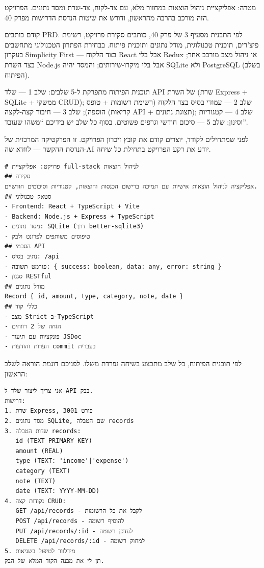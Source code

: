 

מטרה: אפליקציית ניהול הוצאות במחזור מלא, עם צד-לקוח, צד-שרת ומסד נתונים. הפרויקט הזה מורכב בהרבה מהראשון, ודורש את שיטות הנדסת הדרישות מפרק 40.

קודם כותבים PRD. לפי התבנית מסעיף 3 של פרק 40, כותבים סקירת פרויקט, רשימת פיצ'רים, תוכנית טכנולוגית, מודל נתונים ותוכנית פיתוח. בבחירת הפתרון הטכנולוגי מתחשבים בעקרון Simplicity First — בצד הלקוח React אבל בלי Redux או ניהול מצב מורכב אחר; בצד השרת Node.js אבל בלי מיקרו-שירותים; והמסד יהיה SQLite ולא PostgreSQL (בשלב הפיתוח).

תוכנית הפיתוח מתפרקת ל-5 שלבים: שלב 1 — שלד API של השרת (שרת Express + SQLite + ממשקי CRUD); שלב 2 — עמודי בסיס בצד הלקוח (רשימת רשומות + טופס הוספה); שלב 3 — חיבור קצה-לקצה (קריאות API + תצוגת נתונים); שלב 4 — קטגוריות וסינון; שלב 5 — סיכום חודשי וגרפים פשוטים. בסוף כל שלב יש בידיכם “משהו שעובד”.


לפני שמתחילים לקודד, יוצרים קודם את קובץ זיכרון הפרויקט. זו הפרקטיקה המרכזית של הנדסת ההקשר — לוודא שה-AI יודע את רקע הפרויקט בתחילת כל שיחה.

\begin{lstlisting}
# פרויקט: אפליקציית full-stack לניהול הוצאות
## סקירה
אפליקציה לניהול הוצאות אישיות עם תמיכה ברישום הכנסות והוצאות, קטגוריות וסיכומים חודשיים.
## סטאק טכנולוגי
- Frontend: React + TypeScript + Vite
- Backend: Node.js + Express + TypeScript
- מסד נתונים: SQLite (דרך better-sqlite3)
- טיפוסים משותפים לפרונט ולבק
## הסכמי API
- נתיב בסיס: /api
- פורמט תשובה: { success: boolean, data: any, error: string }
- סגנון RESTful
## מודל נתונים
Record { id, amount, type, category, note, date }
## כללי קוד
- מצב Strict ב-TypeScript
- הזחה של 2 רווחים
- פונקציות עם תיעוד JSDoc
- הערות והודעות commit בעברית
\end{lstlisting}


לפי תוכנית הפיתוח, כל שלב מתבצע בשיחה נפרדת משלו. לפניכם דוגמת הוראה לשלב הראשון:

\begin{lstlisting}
אני צריך ליצור שלד ל-API בבק.
דרישות:
1. שרת Express, פורט 3001
2. מסד נתונים SQLite, שם הטבלה records
3. שדות הטבלה records:
   id (TEXT PRIMARY KEY)
   amount (REAL)
   type (TEXT: 'income'|'expense')
   category (TEXT)
   note (TEXT)
   date (TEXT: YYYY-MM-DD)
4. נקודות קצה CRUD:
   GET /api/records - לקבל את כל הרשומות
   POST /api/records - להוסיף רשומה
   PUT /api/records/:id - לעדכן רשומה
   DELETE /api/records/:id - למחוק רשומה
5. מידלוור לטיפול בשגיאות
תן לי את מבנה הקוד המלא של הבק.
\end{lstlisting}

